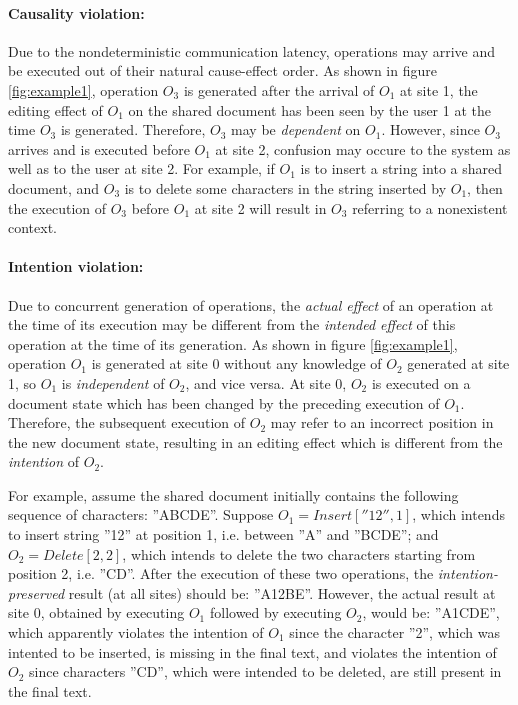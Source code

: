 \documentclass[11pt,a4paper]{article}
\begin{document}
\paragraph{Causality violation:}
Due to the nondeterministic communication latency, operations may arrive and be executed out of their natural cause-effect order. As shown in figure \ref{fig:example1}, operation $O_{3}$ is generated after the arrival of $O_{1}$ at site 1, the editing effect of $O_{1}$ on the shared document has been seen by the user 1 at the time $O_{3}$ is generated. Therefore, $O_{3}$ may be \emph{dependent} on $O_{1}$. However, since $O_{3}$ arrives and is executed before $O_{1}$ at site 2, confusion may occure to the system as well as to the user at site 2. For example, if $O_{1}$ is to insert a string into a shared document, and $O_{3}$ is to delete some characters in the string inserted by $O_{1}$, then the execution of $O_{3}$ before $O_{1}$ at site 2 will result in $O_{3}$ referring to a nonexistent context. 

\paragraph{Intention violation:}
Due to concurrent generation of operations, the \emph{actual effect} of an operation at the time of its execution may be different from the \emph{intended effect} of this operation at the time of its generation. As shown in figure \ref{fig:example1}, operation $O_{1}$ is generated at site 0 without any knowledge of $O_{2}$ generated at site 1, so $O_{1}$ is \emph{independent} of $O_{2}$, and vice versa. At site 0, $O_{2}$ is executed on a document state which has been changed by the preceding execution of $O_{1}$. Therefore, the subsequent execution of $O_{2}$ may refer to an incorrect position in the new document state, resulting in an editing effect which is different from the \emph{intention} of $O_{2}$. 

For example, assume the shared document initially contains the following sequence of characters: ''ABCDE''. Suppose $O_{1}=Insert[''12'',1]$, which intends to insert string ''12'' at position 1, i.e. between ''A'' and ''BCDE''; and $O_{2}=Delete[2,2]$, which intends to delete the two characters starting from position 2, i.e. ''CD''. After the execution of these two operations, the \emph{intention-preserved} result (at all sites) should be: ''A12BE''. However, the actual result at site 0, obtained by executing $O_{1}$ followed by executing $O_{2}$, would be: ''A1CDE'', which apparently violates the intention of $O_{1}$ since the character ''2'', which was intented to be inserted, is missing in the final text, and violates the intention of $O_{2}$ since characters ''CD'', which were intended to be deleted, are still present in the final text.
\end{document}

